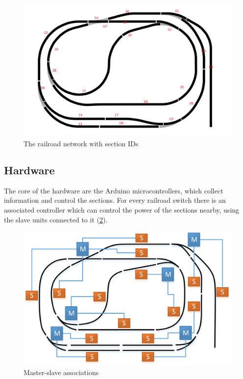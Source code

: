 \begin{figure}[h]
	\centering
	\includegraphics[width=\linewidth]{include/figures/chapter_6/total_view_1}
	\caption{The railroad network with section IDs}
	\label{fig:case_study:total_map}
\end{figure}

\subsection{Hardware}
The core of the hardware are the Arduino microcontrollers, which collect information and control the sections. For every railroad switch there is an associated controller which can control the power of the sections nearby, using the slave units connected to it (\cref{fig:case_study:master_slave}).

\begin{figure}[h]
	\centering
	\includegraphics[width=\linewidth]{include/figures/chapter_6/railroad_ms}
	\caption{Master-slave associations}
	\label{fig:case_study:master_slave}
\end{figure}

